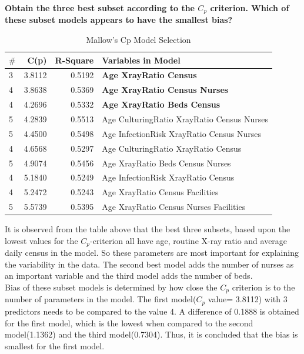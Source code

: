 \documentclass[a4paper,9pt]{article}\usepackage[]{graphicx}\usepackage[]{color}
\begin{document}
\textbf{Obtain the three best subset according to the $C_{p}$ criterion. Which of these subset models appears to have the smallest bias?}\\

\begin{table}[h]
\centering
\begin{tabular}{lrrl}\hline
   $\#$ &    C(p) &    R-Square &    Variables in Model\\
   \hline
   3 &    3.8112 &    0.5192 &    \textbf{Age XrayRatio Census}\\
   4 &    3.8638 &    0.5369 &    \textbf{Age XrayRatio Census Nurses}\\
   4 &    4.2696 &    0.5332 &    \textbf{Age XrayRatio Beds Census}\\
   5 &    4.2839 &    0.5513 &    Age CulturingRatio XrayRatio Census Nurses\\
   5 &    4.4500 &    0.5498 &    Age InfectionRisk XrayRatio Census Nurses\\
   4 &    4.6568 &    0.5297 &    Age CulturingRatio XrayRatio Census\\
   5 &    4.9074 &    0.5456 &    Age XrayRatio Beds Census Nurses\\
   4 &    5.1840 &    0.5249 &    Age InfectionRisk XrayRatio Census\\
   4 &    5.2472 &    0.5243 &    Age XrayRatio Census Facilities\\
   5 &    5.5739 &    0.5395 &    Age XrayRatio Census Nurses Facilities\\
   \hline
\end{tabular}
\caption{Mallow's Cp Model Selection}
\end{table}

It is observed from the table above that the best three subsets, based upon the lowest values for the $C_p$-criterion all have age, routine X-ray ratio and average daily census in the model. So these parameters are most important for explaining the variability in the data. The second best model adds the number of nurses as an important variable and the third model adds the number of beds.\\

Bias of these subset models is determined by how close the $C_p$ criterion is to the number of parameters in the model. The first model($C_p$ value= 3.8112) with 3 predictors needs to be compared to the value 4. A difference of 0.1888 is obtained for the first model, which is the lowest when compared to the second model(1.1362) and the third model(0.7304). Thus, it is  concluded that the bias is smallest for the first model.
\end{document}
